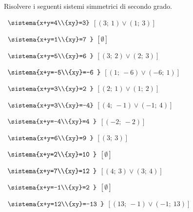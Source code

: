 \begin{esercizio}[\Ast]
 \label{ese:6.14}
Risolvere i seguenti sistemi simmetrici di secondo grado.
\begin{multicols}{2}
 \begin{enumeratea}
 \item~\(\sistema{x+y=4\\{xy}=3}\)
  \hfill\(\left[(3;~1)\vee(1;~3)\right]\)
 \item~\(\sistema{x+y=1\\{xy}=7 }\)
  \hfill\(\left[\emptyset\right]\)
 \item~\(\sistema{x+y=5\\{xy}=6 }\)
  \hfill\(\left[(3;~2)\vee(2;~3)\right]\)
 \item~\(\sistema{x+y=-5\\{xy}=-6 }\)
  \hfill\(\left[(1;~-6)\vee(-6;~1)\right]\)
 \item~\(\sistema{x+y=3\\{xy}=2 }\)
  \hfill\(\left[(2;~1)\vee(1;~2)\right]\)
 \item~\(\sistema{x+y=3\\{xy}=-4}\)
  \hfill\(\left[(4;~-1)\vee(-1;~4)\right]\)
 \item~\(\sistema{x+y=-4\\{xy}=4 }\)
  \hfill\(\left[(-2;~-2)\right]\)
 \item~\(\sistema{x+y=6\\{xy}=9 }\)
  \hfill\(\left[(3;~3)\right]\)
 \item~\(\sistema{x+y=2\\{xy}=10 }\)
  \hfill\(\left[\emptyset\right]\)
 \item~\(\sistema{x+y=7\\{xy}=12 }\)
  \hfill\(\left[(4;~3)\vee(3;~4)\right]\)
 \item~\(\sistema{x+y=-1\\{xy}=2 }\)
  \hfill\(\left[\emptyset\right]\)
 \item~\(\sistema{x+y=12\\{xy}=-13 }\)
  \hfill\(\left[(13;~-1)\vee(-1;~13)\right]\)

\end{enumeratea}
\end{multicols}
\end{esercizio}

